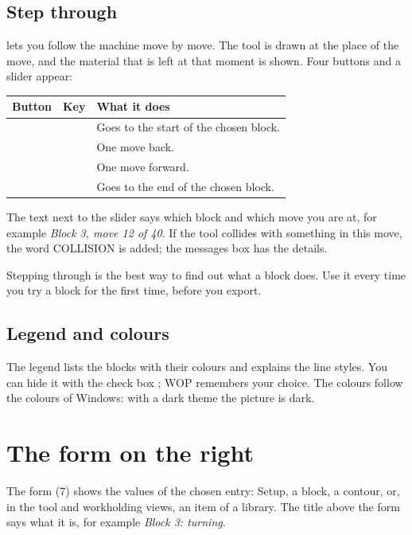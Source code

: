 \subsection{Step through}\label{sec:window:stepping}
 lets you follow the machine move by move. The tool is drawn at the place of the move, and the material that is left at that moment is shown. Four buttons and a slider appear:

\begin{center}
\begin{tabularx}{\textwidth}{@{}l l Y@{}}
\toprule
\textbf{Button} & \textbf{Key} & \textbf{What it does} \\
\midrule
\button{|<} &  & Goes to the start of the chosen block. \\
\button{<} &  & One move back. \\
\button{>} &  & One move forward. \\
\button{>|} &  & Goes to the end of the chosen block. \\
\bottomrule
\end{tabularx}
\end{center}

The text next to the slider says which block and which move you are at, for example \emph{Block 3, move 12 of 40}. If the tool collides with something in this move, the word \textsf{COLLISION} is added; the messages box has the details.

\begin{notebox}
Stepping through is the best way to find out what a block does. Use it every time you try a block for the first time, before you export.
\end{notebox}

\subsection{Legend and colours}
The legend lists the blocks with their colours and explains the line styles. You can hide it with the check box ; WOP remembers your choice. The colours follow the colours of Windows: with a dark theme the picture is dark.

\section{The form on the right}\label{sec:window:form}

The form (7) shows the values of the chosen entry: Setup, a block, a contour, or, in the tool and workholding views, an item of a library. The title above the form says what it is, for example \emph{Block 3: turning}.

